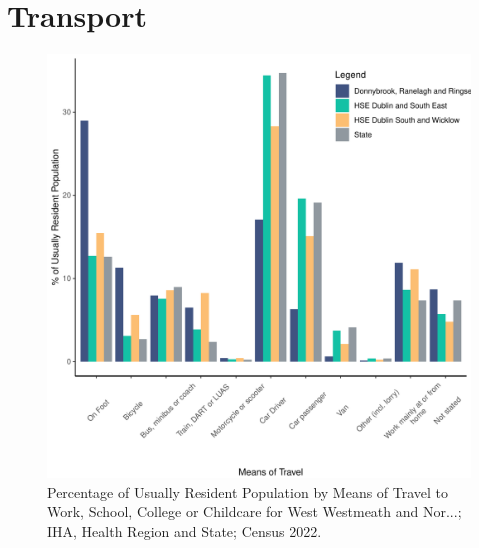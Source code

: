 \documentclass{article}
\begin{document}
\section{Transport}\label{sect:Trans}
\begin{figure}[H]
	\centering
	\includegraphics[width = 120mm]{../figures/TravelED.pdf}
	\caption{Percentage of Usually Resident Population by Means of Travel to Work, School, College or Childcare for West Westmeath and Nor...; IHA, Health Region and State; Census 2022.}
	\label{fig:vbnv}
	\end{figure}
\end{document}
